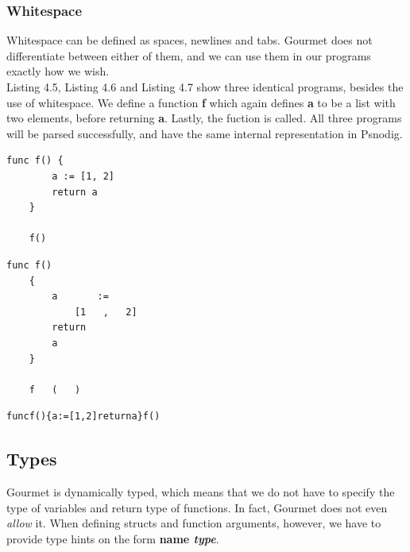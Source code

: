 \subsubsection{Whitespace}

Whitespace can be defined as spaces, newlines and tabs. Gourmet does not differentiate between either of them, and we can use them in our programs exactly how we wish. \hfill \\

Listing 4.5, Listing 4.6 and Listing 4.7 show three identical programs, besides the use of whitespace. We define a function \textbf{f} which again defines \textbf{a} to be a list with two elements, before returning \textbf{a}. Lastly, the fuction is called. All three programs will be parsed successfully, and have the same internal representation in Psnodig. \hfill \\

\begin{lstlisting}[caption={f with a standard amount of whitespace}, captionpos=b]
    func f() {
        a := [1, 2]
        return a
    }

    f()    
\end{lstlisting}

\begin{lstlisting}[caption={f with a lot of whitespace}, captionpos=b]
    func f()
    {
        a       :=
            [1   ,   2]
        return
        a
    }
    
    f   (   )
\end{lstlisting}

\begin{lstlisting}[caption={f with no whitespace}, captionpos=b]
    funcf(){a:=[1,2]returna}f()
\end{lstlisting}


\subsection{Types}

Gourmet is dynamically typed, which means that we do not have to specify the type of variables and return type of functions. In fact, Gourmet does not even \textit{allow} it. When defining structs and function arguments, however, we have to provide type hints on the form \textbf{name \textit{type}}. \hfill \\

